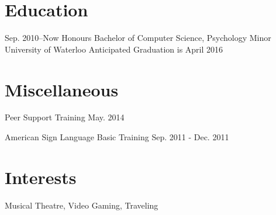 \documentclass[]{friggeri-cv} %
\begin{document}
\section{Education}

\begin{sectionlist}
		
	\entry
	{Sep. 2010--Now}
	{Honours Bachelor of Computer Science, Psychology Minor}
	{University of Waterloo}
	{Anticipated Graduation is April 2016}
\end{sectionlist}

\section{Miscellaneous}

\begin{sectionlist}
	\misc
	{Peer Support Training}
	{May. 2014}
	
	\misc
	{American Sign Language Basic Training}
	{Sep. 2011 - Dec. 2011}
\end{sectionlist}


\section{Interests}
\begin{sectionlist}
	{Musical Theatre, Video Gaming, Traveling}
\end{sectionlist}
\end{document}

